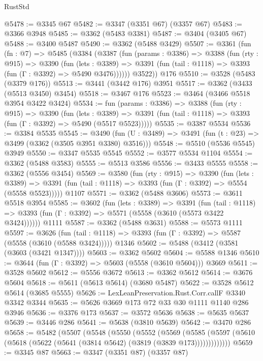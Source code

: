 \begin{lexlean}{RustStd}
\begin{coremodule}
@5478 := @3345 @67
@5482 := @3347 (@3351 @67) (@3357 @67)
@5483 := @3366 @3948
@5485 := @3362 (@5483 @3381)
@5487 := @3404 (@3405 @67)
@5488 := @3400 @5487
@5490 := @3362 (@5488 @3429)
@5507 := @3361
    (fun (fn : @7) =>
    @5485
      (@3384
        (@3387
          (fun (params : @3386) =>
          @3388
            (fun (rty : @915) =>
            @3390
              (fun (lets : @3389) =>
              @3391 (fun (tail : @1118) => @3393 (fun (Γ : @3392) => @5490 @3476))))))
        @3522))
    @176
@5510 := @3528 (@5483 (@3379 @176))
@5513 := @3441 (@3442 @176) @3951
@5517 := @3362 (@3433 (@5513 @3450) @3454)
@5518 := @3467 @176
@5523 := @3464 (@3466 @5518 @3954 @3422 @3424)
@5534 := fun (params : @3386) =>
  @3388
    (fun (rty : @915) =>
    @3390
      (fun (lets : @3389) =>
      @3391 (fun (tail : @1118) => @3393 (fun (Γ : @3392) => @5490 (@5517 @5523)))))
@5535 := @3387 @5534
@5536 := @3384 @5535
@5545 := @3490 (fun (U : @3489) => @3491 (fun (t : @23) => @3499 (@3362 (@3505 @3951 @3380) @3516)))
@5548 := @5510 (@5536 @5545) @3949
@5550 := @3347 @5535 @5545
@5552 := @3577 @5534 @1104
@5554 := @3362 (@5488 @3583)
@5555 := @5513 @3586
@5556 := @3433 @5555
@5558 := @3362 (@5556 @3454)
@5569 := @3580
    (fun (rty : @915) =>
    @3390
      (fun (lets : @3389) =>
      @3391 (fun (tail : @1118) => @3393 (fun (Γ : @3392) => @5554 (@5558 @5523)))))
    @1107
@5571 := @3362 (@5488 @3606)
@5573 := @3611 @5518 @3954
@5585 := @3602
    (fun (lets : @3389) =>
    @3391
      (fun (tail : @1118) => @3393 (fun (Γ : @3392) => @5571 (@5558 (@3610 (@5573 @3422 @3424))))))
    @1111
@5587 := @3362 (@5488 @3631)
@5588 := @5573 @1111
@5597 := @3626
    (fun (tail : @1118) => @3393 (fun (Γ : @3392) => @5587 (@5558 (@3610 (@5588 @3424)))))
    @1346
@5602 := @5488 (@3412 (@3581 (@3603 (@3421 @1347))))
@5603 := @3362 @5602
@5604 := @5588 @1346
@5610 := @3644 (fun (Γ : @3392) => @5603 (@5558 (@3610 @5604))) @3669
@5611 := @3528 @5602
@5612 := @5556 @3672
@5613 := @3362 @5612
@5614 := @3676 @5604
@5618 := @5611 (@5613 @5614) (@3680 @5487)
@5622 := @3528 @5612 @5614 (@3685 @5555)
@5626 := LexLeanPreservation.Rust.Corr.callF @3340 @3342 @3344
@5635 := @5626 @3669 @173 @72 @33 @30 @1111 @1140 @286 @3946
@5636 := @3376 @173
@5637 := @3572 @5636
@5638 := @5635 @5637
@5639 := @3446 @286
@5641 := @5638 (@3810 @5639)
@5642 := @3470 @286
@5658 := @5482
    (@5507
      (@5548
        (@5550
          (@5552
            (@5569
              (@5585
                (@5597 (@5610 (@5618 (@5622 (@5641 (@3814 @5642) (@3819 (@3839 @173)))))))))))))
@5659 := @3345 @87
@5663 := @3347 (@3351 @87) (@3357 @87)

\end{coremodule}
\end{lexlean}
